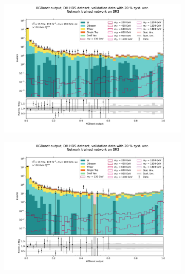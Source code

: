 \documentclass[12pt, a4paper]{book}
\begin{document}
\begin{figure}[!ht]
	\centering
	\begin{subfigure}[b]{0.49\textwidth}
      \centering
      \includegraphics[width=1\textwidth]{XGBoost/Model_independent/150/DH_HDS/VAL_ee.pdf}
   \end{subfigure}
   \hfill
   \begin{subfigure}[b]{0.49\textwidth}
      \centering
      \includegraphics[width=1\textwidth]{XGBoost/Model_independent/150/DH_HDS/VAL_uu.pdf}
   \end{subfigure}
   \hfill
   \begin{subfigure}[b]{0.49\textwidth}
      \centering

\end{subfigure}
\end{figure}
\end{document}
